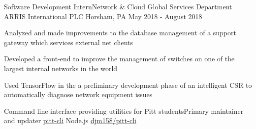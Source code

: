 \vspace{-1mm}

\vspace{-1mm}
\begin{cventries}

  \cventry
    {Software Development Intern{\enskip\cdotp\enskip}Network \& Cloud Global Services Department} %
    {ARRIS International PLC} %
    {Horsham, PA} %
    {May 2018 - August 2018} %
    {
      \begin{cvitems} %
        \item {Analyzed and made improvements to the database management of a support gateway which services external net clients}
        \item {Developed a front-end to improve the management of switches on one of the largest internal networks in the world}
        \item {Used TensorFlow in the a preliminary development phase of an intelligent CSR to automatically diagnose network equipment issues}
      \end{cvitems}
    }

  \vspace{1mm}

  \cventrywork
    {Command line interface providing utilities for Pitt students{\enskip\cdotp\enskip}Primary maintainer and updater} %
    {\href{https://www.npmjs.com/package/pitt-cli}{\faCodeFork \hspace{0.5mm}pitt-cli}} %
    {Node.js} %
    {\href{https://github.com/djm158/pitt-cli}{\faGithub \hspace{0.5mm} djm158/pitt-cli}} %

  \vspace{-5mm}

\end{cventries}
